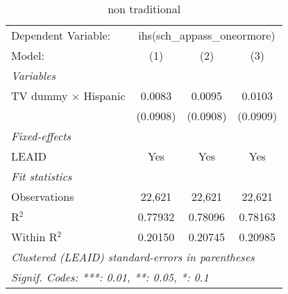 \begin{table}[htbp]
\centering
\caption{non traditional}
\begin{tabular}{lccc}
\tabularnewline\midrule\midrule
Dependent Variable:&\multicolumn{3}{c}{ihs(sch\_appass\_oneormore)}\\
Model:&(1) & (2) & (3)\\
\midrule \emph{Variables}&   &   &  \\
TV dummy $\times$ Hispanic & 0.0083 & 0.0095 & 0.0103\\
  &(0.0908) & (0.0908) & (0.0909)\\
\midrule \emph{Fixed-effects}&   &   &  \\
LEAID & Yes & Yes & Yes\\
\midrule \emph{Fit statistics}&  & & \\
Observations & 22,621&22,621&22,621\\
R$^2$ & 0.77932&0.78096&0.78163\\
Within R$^2$ & 0.20150&0.20745&0.20985\\
\midrule\midrule\multicolumn{4}{l}{\emph{Clustered (LEAID) standard-errors in parentheses}}\\
\multicolumn{4}{l}{\emph{Signif. Codes: ***: 0.01, **: 0.05, *: 0.1}}\\
\end{tabular}
\end{table}

